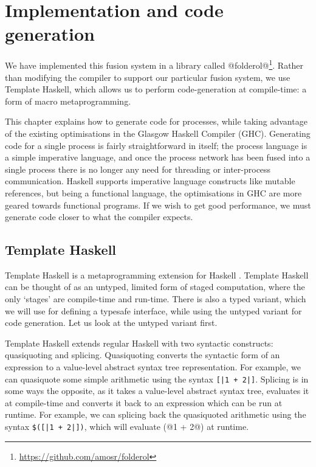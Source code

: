 \chapter{Implementation and code generation}
\label{chapter:process:implementation}


We have implemented this fusion system  in a library called @folderol@\footnote{\url{https://github.com/amosr/folderol}}.
Rather than modifying the compiler to support our particular fusion system, we use Template Haskell, which allows us to perform code-generation at compile-time: a form of macro metaprogramming.

This chapter explains how to generate code for processes, while taking advantage of the existing optimisations in the Glasgow Haskell Compiler (GHC).
Generating code for a single process is fairly straightforward in itself; the process language is a simple imperative language, and once the process network has been fused into a single process there is no longer any need for threading or inter-process communication.
Haskell supports imperative language constructs like mutable references, but being a functional language, the optimisations in GHC are more geared towards functional programs.
If we wish to get good performance, we must generate code closer to what the compiler expects.

\section{Template Haskell}
Template Haskell is a metaprogramming extension for Haskell \cite{sheard2002template}.
Template Haskell can be thought of as an untyped, limited form of staged computation, where the only `stages' are compile-time and run-time.
There is also a typed variant, which we will use for defining a typesafe interface, while using the untyped variant for code generation.
Let us look at the untyped variant first.

Template Haskell extends regular Haskell with two syntactic constructs: quasiquoting and splicing.
Quasiquoting converts the syntactic form of an expression to a value-level abstract syntax tree representation.
For example, we can quasiquote some simple arithmetic using the syntax \lstinline/[|1 + 2|]/.
Splicing is in some ways the opposite, as it takes a value-level abstract syntax tree, evaluates it at compile-time and converts it back to an expression which can be run at runtime.
For example, we can splicing back the quasiquoted arithmetic using the syntax \lstinline/$([|1 + 2|])/, which will evaluate (@1 + 2@) at runtime.


